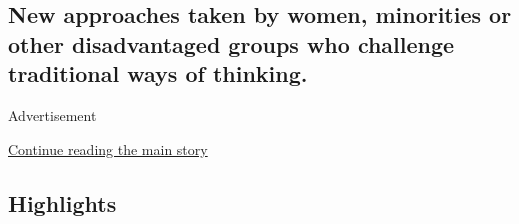\hypertarget{new-approaches-taken-by-women-minorities-or-other-disadvantaged-groups-who-challenge-traditional-ways-of-thinking-1}{%
\subsection{New approaches taken by women, minorities or other
disadvantaged groups who challenge traditional ways of
thinking.}\label{new-approaches-taken-by-women-minorities-or-other-disadvantaged-groups-who-challenge-traditional-ways-of-thinking-1}}

Advertisement

\protect\hyperlink{after-subheader}{Continue reading the main story}

\hypertarget{highlights}{%
\subsection{Highlights}\label{highlights}}

